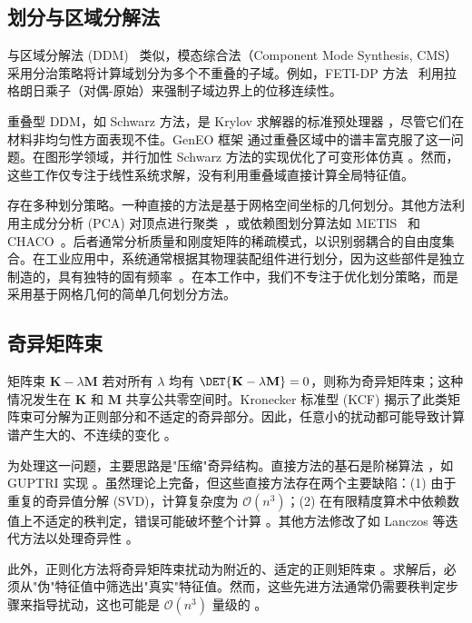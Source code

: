 \subsection{划分与区域分解法}

与区域分解法 (DDM)~\cite{Smith1997DDM} 类似，模态综合法（Component Mode Synthesis, CMS）采用分治策略将计算域划分为多个不重叠的子域。例如，FETI-DP 方法~\cite{Farhat2001FETIDP} 利用拉格朗日乘子（对偶-原始）来强制子域边界上的位移连续性。

重叠型 DDM，如 Schwarz 方法，是 Krylov 求解器的标准预处理器 \cite{M2AN_2005__39_4_693_0, Marco2024Overlap}，尽管它们在材料非均匀性方面表现不佳。GenEO 框架 \cite{NicoleSpillaneSolve2013,Ryadh2015Schwarz,Spillane2025GenEO} 通过重叠区域中的谱丰富克服了这一问题。在图形学领域，并行加性 Schwarz 方法的实现优化了可变形体仿真 \cite{Wu:2022:GBM}。然而，这些工作仅专注于线性系统求解，没有利用重叠域直接计算全局特征值。

存在多种划分策略。一种直接的方法是基于网格空间坐标的几何划分。其他方法利用主成分分析 (PCA) 对顶点进行聚类~\cite{HUANG2006927}，或依赖图划分算法如 METIS~\cite{Karypis1995graph, Karypis1997METIS} 和 CHACO~\cite{Hendrickson2011}。后者通常分析质量和刚度矩阵的稀疏模式，以识别弱耦合的自由度集合。在工业应用中，系统通常根据其物理装配组件进行划分，因为这些部件是独立制造的，具有独特的固有频率~\cite{Vysok2017CurrentCO}。在本工作中，我们不专注于优化划分策略，而是采用基于网格几何的简单几何划分方法。

\subsection{奇异矩阵束}\label{sec:singluar-matrix-pencil}

矩阵束 $\mathbf{K} - \lambda \mathbf{M}$ 若对所有 $\lambda$ 均有 $\DET{\mathbf{K} - \lambda \mathbf{M}} = 0$，则称为奇异矩阵束；这种情况发生在 $\mathbf{K}$ 和 $\mathbf{M}$ 共享公共零空间时。Kronecker 标准型 (KCF) \cite{gantmakher2000theory, Van1979Kronecker, Berger2012QuasiKroneckerFrom} 揭示了此类矩阵束可分解为正则部分和不适定的奇异部分。因此，任意小的扰动都可能导致计算谱产生大的、不连续的变化 \cite{Hochstenbach2019SolvingSingular, Kressner2024AnalysisOfeigenvalue}。

为处理这一问题，主要思路是"压缩"奇异结构。直接方法的基石是阶梯算法 \cite{Demmel1993TheGS, Van1979Kronecker}，如 GUPTRI 实现 \cite{Demmel1993TheGS}。虽然理论上完备，但这些直接方法存在两个主要缺陷：(1) 由于重复的奇异值分解 (SVD)，计算复杂度为 $\mathcal{O}(n^3)$；(2) 在有限精度算术中依赖数值上不适定的秩判定，错误可能破坏整个计算 \cite{Edelman2000StaircaseFailures}。其他方法修改了如 Lanczos 等迭代方法以处理奇异性 \cite{Lin2021ShiftInvertLanczos, karl2024ShiftInvertArnoldi}。

此外，正则化方法将奇异矩阵束扰动为附近的、适定的正则矩阵束 \cite{Fernando2008FirstOrder, Hochstenbach2019SolvingSingular}。求解后，必须从"伪"特征值中筛选出"真实"特征值。然而，这些先进方法通常仍需要秩判定步骤来指导扰动，这也可能是 $\mathcal{O}(n^3)$ 量级的 \cite{Hochstenbach2019SolvingSingular, karl2024ShiftInvertArnoldi}。